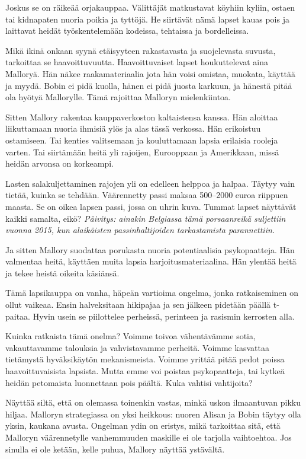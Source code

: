 Joskus se on räikeää orjakauppaa. Välittäjät matkustavat köyhiin kyliin, ostaen tai kidnapaten nuoria poikia ja tyttöjä. He siirtävät nämä lapset kauas pois ja laittavat heidät työskentelemään kodeissa, tehtaissa ja bordelleissa.

Mikä ikinä onkaan syynä etäisyyteen rakastavasta ja suojelevasta suvusta, tarkoittaa se haavoittuvuutta. Haavoittuvaiset lapset houkuttelevat aina Malloryä. Hän näkee raakamateriaalia jota hän voisi omistaa, muokata, käyttää ja myydä. Bobin ei pidä kuolla, hänen ei pidä juosta karkuun, ja hänestä pitää ola hyötyä Mallorylle. Tämä rajoittaa Malloryn mielenkiintoa.

Sitten Mallory rakentaa kauppaverkoston kaltaistensa kanssa. Hän aloittaa liikuttamaan nuoria ihmisiä ylös ja alas tässä verkossa. 
Hän erikoistuu ostamiseen. Tai kenties valitsemaan ja kouluttamaan lapsia erilaisia rooleja varten. Tai siirtämään heitä yli rajoijen, Eurooppaan ja Amerikkaan, missä heidän arvonsa on korkeampi.

Lasten salakuljettaminen rajojen yli on edelleen helppoa ja halpaa. Täytyy vain tietää, kuinka se tehdään. Väärennetty passi maksaa 500--2000 euroa riippuen maasta. Se on oikea lapsen passi, jossa on uhrin kuva. Tummat lapset näyttävät kaikki samalta, eikö? \emph{Päivitys: ainakin Belgiassa tämä porsaanreikä suljettiin vuonna 2015, kun alaikäisten passinhaltijoiden tarkastamista parannettiin.}

Ja sitten Mallory suodattaa porukasta nuoria potentiaalisia psykopaatteja. Hän valmentaa heitä, käyttäen muita lapsia harjoitusmateriaalina. Hän ylentää heitä ja tekee heistä oikeita käsiänsä.

Tämä lapsikauppa on vanha, häpeän vartioima ongelma, jonka ratkaiseminen on ollut vaikeaa. Ensin halveksitaan hikipajaa ja sen jälkeen pidetään päällä t-paitaa. Hyvin usein se piilottelee perheissä, perinteen ja rasismin kerrosten alla.

Kuinka ratkaista tämä onelma? Voimme toivoa vähentävämme sotia, vakauttavamme talouksia ja vahvistavamme perheitä. Voimme kasvattaa tietämystä hyväksikäytön mekanismeista. Voimme yrittää pitää pedot poissa haavoittuvaisista lapsista. Mutta emme voi poistaa psykopaatteja, tai kytkeä heidän petomaista luonnettaan pois päältä. Kuka vahtisi vahtijoita?

Näyttää siltä, että on olemassa toinenkin vastas, minkä uskon ilmaantuvan pikku hiljaa. Malloryn strategiassa on yksi heikkous: nuoren Alisan ja Bobin täytyy olla yksin, kaukana avusta. Ongelman ydin on eristys, mikä tarkoittaa sitä, että Malloryn väärennetylle vanhemmuuden maskille ei ole tarjolla vaihtoehtoa. Jos sinulla ei ole ketään, kelle puhua, Mallory näyttää ystävältä.

